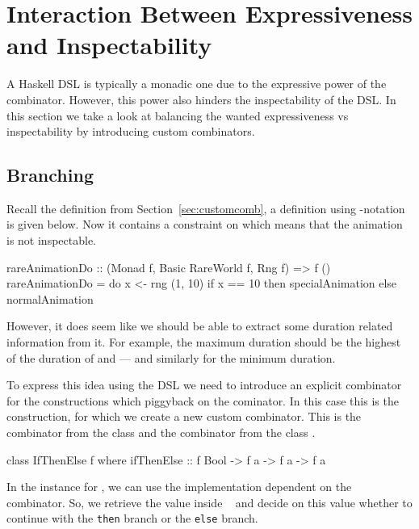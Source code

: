 \section{Interaction Between Expressiveness and Inspectability}
\label{sec:interaction}

A Haskell DSL is typically a monadic one due to the expressive power of the \hs{>>=} combinator. However, this power also hinders the inspectability of the DSL. In this section we take a look at balancing the wanted expressiveness vs inspectability by introducing custom combinators.

\subsection{Branching}

Recall the  definition from Section~\ref{sec:customcomb}, a definition using -notation is given below. Now it contains a  constraint on  which means that the animation is not inspectable.

\begin{code}
rareAnimationDo :: (Monad f, Basic RareWorld f, Rng f) => f ()
rareAnimationDo = do
  x <- rng (1, 10)
  if x == 10
    then specialAnimation
    else normalAnimation
\end{code}

However, it does seem like we should be able to extract some duration related information from it. For example, the maximum duration should be the highest of the duration of  and  --- and similarly for the minimum duration.

To express this idea using the DSL we need to introduce an explicit combinator for the constructions which piggyback on the \hs{>>=} cominator. In this case this is the  construction, for which we create a new custom combinator. This is the  combinator from the  class \cite{DBLP:phd/ethos/Yallop10} and the  combinator from the  class \cite{Mokhov:2019:SAF:3352468.3341694}.

\begin{code}
class IfThenElse f where
  ifThenElse :: f Bool -> f a -> f a -> f a
\end{code}

In the instance for , we can use the implementation dependent on the \hs{>>=} combinator. So, we retrieve the value inside ~ and decide on this value whether to continue with the \texttt{then} branch or the \texttt{else} branch.

